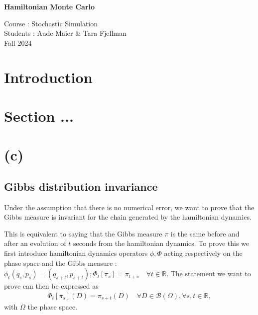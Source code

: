 \documentclass[a4paper, 12pt,oneside]{article}
\begin{document}
 
	\begin{center}
	    \Large
	    \textbf{Hamiltonian Monte Carlo} 
	    \vspace{0.4cm}
	    \large

		Course : Stochastic Simulation \\
	    Students : Aude Maier \& Tara Fjellman \\
	    \small{Fall 2024}
	\end{center}

	\section{Introduction}
	\section{Section ...}
	\section{(c)}
        \subsection{Gibbs distribution invariance}
		Under the assumption that there is no numerical error, we want to prove that the Gibbs measure is invariant for the chain generated by the hamiltonian dynamics.

		This is equivalent to saying that the Gibbs measure $\pi$ is the same before and after an evolution of $t$ seconds from the hamiltonian dynamics. 
		To prove this we first introduce hamiltonian dynamics operators $\phi,\Phi$ acting respectively on the phase space and the Gibbs measure : $\phi_t(q_s,p_s)=(q_{s+t},p_{s+t});\Phi_t[\pi_s]=\pi_{t+s}\quad \forall t\in\mathbb{R}$.
		The statement we want to prove can then be expressed as 
		\begin{gather}
			\Phi_t[\pi_s](D)=\pi_{s+t}(D)\quad \forall D\in\mathcal{B}(\Omega),\forall s,t\in\mathbb{R},
		\end{gather}
		with $\Omega$ the phase space.
\end{document}
